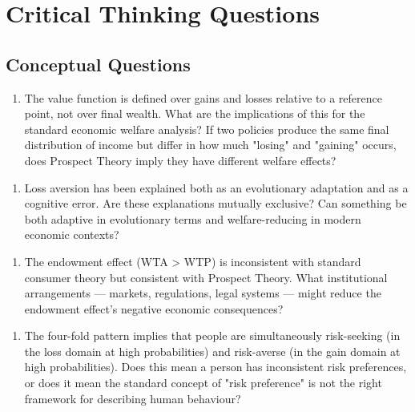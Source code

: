 \documentclass[12pt, letterpaper]{article}
\begin{document}
\medskip


\section*{Critical Thinking Questions}



\subsection{Conceptual Questions}


\begin{enumerate}
\item The value function is defined over gains and losses relative to a reference point, not over final wealth. What are the implications of this for the standard economic welfare analysis? If two policies produce the same final distribution of income but differ in how much "losing" and "gaining" occurs, does Prospect Theory imply they have different welfare effects?
\end{enumerate}

\begin{enumerate}
\item Loss aversion has been explained both as an evolutionary adaptation and as a cognitive error. Are these explanations mutually exclusive? Can something be both adaptive in evolutionary terms and welfare-reducing in modern economic contexts?
\end{enumerate}

\begin{enumerate}
\item The endowment effect (WTA > WTP) is inconsistent with standard consumer theory but consistent with Prospect Theory. What institutional arrangements --- markets, regulations, legal systems --- might reduce the endowment effect's negative economic consequences?
\end{enumerate}

\begin{enumerate}
\item The four-fold pattern implies that people are simultaneously risk-seeking (in the loss domain at high probabilities) and risk-averse (in the gain domain at high probabilities). Does this mean a person has inconsistent risk preferences, or does it mean the standard concept of "risk preference" is not the right framework for describing human behaviour?
\end{enumerate}
\end{document}

